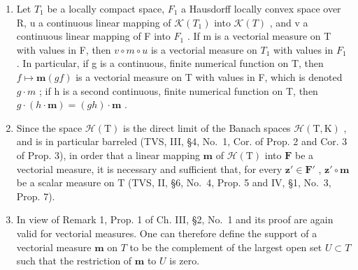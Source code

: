 \begin{enumerate}
\def\labelenumi{\arabic{enumi})}
\setcounter{enumi}{1}
\item
  Let \(T_{1}\) be a locally compact space, \(F_{1}\) a Hausdorff locally convex space over R, u a continuous linear mapping of \(\mathcal{K}(T_{1})\) into \(\mathcal{K}(T)\) , and v a continuous linear mapping of F into \(F_{1}\) . If m is a vectorial measure on T with values in F, then \(v \circ m \circ u\) is a vectorial measure on \(T_{1}\) with values in \(F_{1}\) . In particular, if g is a continuous, finite numerical function on T, then \(f \mapsto \mathbf{m}(gf)\) is a vectorial measure on T with values in F, which is denoted \(g \cdot m\) ; if h is a second continuous, finite numerical function on T, then \(g \cdot (h \cdot \mathbf{m}) = (gh) \cdot \mathbf{m}\) .
\item
  Since the space \(\mathcal{H}(\mathrm{T})\) is the direct limit of the Banach spaces \(\mathcal{H}(\mathrm{T},\mathrm{K})\) , and is in particular barreled (TVS, III, §4, No.~1, Cor. of Prop. 2 and Cor. 3 of Prop. 3), in order that a linear mapping \(\mathbf{m}\) of \(\mathcal{H}(\mathrm{T})\) into \(\mathbf{F}\) be a vectorial measure, it is necessary and sufficient that, for every \(\mathbf{z}' \in \mathbf{F}'\) , \(\mathbf{z}' \circ \mathbf{m}\) be a scalar measure on \(\mathrm{T}\) (TVS, II, §6, No.~4, Prop. 5 and IV, §1, No.~3, Prop. 7).
\item
  In view of Remark 1, Prop. 1 of Ch. III, §2, No.~1 and its proof are again valid for vectorial measures. One can therefore define the support of a vectorial measure \(\mathbf{m}\) on \(T\) to be the complement of the largest open set \(U \subset T\) such that the restriction of \(\mathbf{m}\) to \(U\) is zero.
\end{enumerate}

